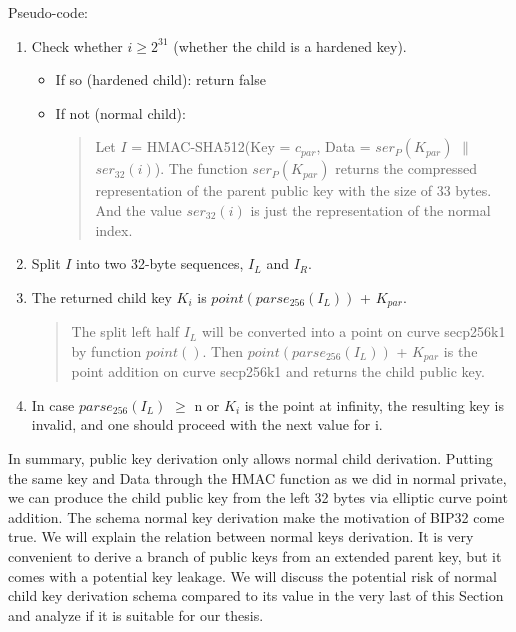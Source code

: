 Pseudo-code:
\begin{enumerate}
    \item Check whether $i \geq 2^{31}$ (whether the child is a hardened key).
          \begin{itemize}
              \item If so (hardened child): return false

              \item If not (normal child):
                    \begin{quote}

                        Let $I$ = HMAC-SHA512(Key = $c_{par}$, Data = $ser_{P}(K_{par})$ $\parallel$ $ser_{32}(i)$).
                        The function $ser_{P}(K_{par})$ returns the compressed representation of the parent public key with the size of 33 bytes. And the value $ser_{32}(i)$ is just the representation of the normal index.
                    \end{quote}
          \end{itemize}
          \bigskip

    \item Split $I$ into two 32-byte sequences, $I_L$ and $I_R$.
          \bigskip

    \item The returned child key $K_i$ is $point(parse_{256}(I_L))$ + $K_{par}$.

          \begin{quote}
              The split left half $I_L$ will be converted into a point on curve secp256k1 by function $point()$. Then $point(parse_{256}(I_L))$ + $K_{par}$ is the point addition on curve secp256k1 and returns the child public key.
          \end{quote}
          \bigskip

    \item In case $parse_{256}(I_L)$ $\geq$ n or $K_i$ is the point at infinity, the resulting key is invalid, and one should proceed with the next value for i.

\end{enumerate}

In summary, public key derivation only allows normal child derivation.
Putting the same key and Data through the HMAC function as we did in normal private, we can produce the child public key from the left 32 bytes via elliptic curve point addition.
The schema normal key derivation make the motivation of BIP32 come true. We will explain the relation between normal keys derivation.
It is very convenient to derive a branch of public keys from an extended parent key, but it comes with a potential key leakage.
We will discuss the potential risk of normal child key derivation schema compared to its value in the very last of this Section and analyze if it is suitable for our thesis.


